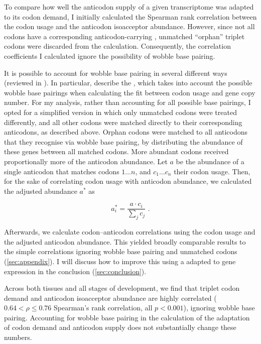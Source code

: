 To compare how well the anticodon supply of a given transcriptome was adapted to
its codon demand, I initially calculated the Spearman rank correlation between
the codon usage and the anticodon isoacceptor abundance. However, since not all
codons have a corresponding anticodon-carrying \trna, unmatched “orphan” triplet
codons were discarded from the calculation. Consequently, the correlation
coefficients I calculated ignore the possibility of wobble base pairing.

It is possible to account for wobble base pairing in several different ways
(reviewed in \citet{Gingold:2011}). In particular, \citet{Dos_Reis:2003}
describe the \tai, which takes into account the possible wobble base pairings
when calculating the fit between codon usage and \trna gene copy number. For my
analysis, rather than accounting for all possible base pairings, I opted for a
simplified version in which only unmatched codons were treated differently, and
all other codons were matched directly to their corresponding anticodons, as
described above. Orphan codons were matched to all anticodons that they
recognise via wobble base pairing, by distributing the \trna abundance of these
\trna genes between all matched codons. More abundant codons received
proportionally more of the anticodon abundance. Let \(a\) be the abundance of a
single anticodon that matches codons \(1\dots n\), and \(c_1\dots c_n\) their
codon usage. Then, for the sake of correlating codon usage with anticodon
abundance, we calculated the adjusted abundance \(a^*\) as

\begin{equation}
    a_i^* = \frac{a \cdot c_i}{\sum_j c_j} \text{\ .}
\end{equation}

Afterwards, we calculate codon--anticodon correlations using the codon usage and
the adjusted anticodon abundance. This yielded broadly comparable results to the
simple correlations ignoring wobble base pairing and unmatched codons
(\cref{sec:appendix}). I will discuss how to improve this using a \tai adapted
to \trna gene expression in the conclusion (\cref{sec:conclusion}).

Across both tissues and all stages of development, we find that \mrna triplet
codon demand and \trna anticodon isoacceptor abundance are highly correlated
(\(0.64 < \rho \leq 0.76\) Spearman’s rank correlation, all \(p < 0.001\)),
ignoring wobble base pairing. Accounting for wobble base pairing in the
calculation of the adaptation of codon demand and anticodon supply does not
substantially change these numbers.

